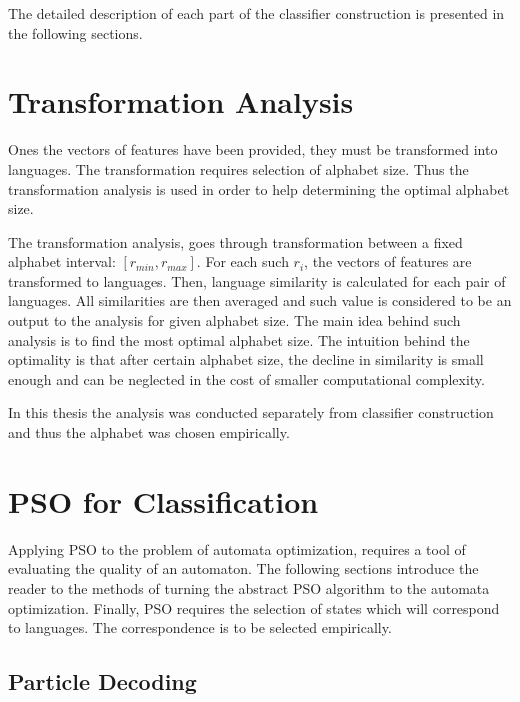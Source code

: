 \documentclass{mini}
\begin{document}
The detailed description of each part of the classifier construction is presented in the following sections.

\section{Transformation Analysis}
Ones the vectors of features have been provided, they must be transformed into languages. The transformation requires selection of alphabet size. Thus the transformation analysis is used in order to help determining the optimal alphabet size.

The transformation analysis, goes through transformation between a fixed alphabet interval: $[r_{min}, r_{max}]$. For each such $r_{i}$, the vectors of features are transformed to languages. Then, language similarity is calculated for each pair of languages. All similarities are then averaged and such value is considered to be an output to the analysis for given alphabet size. The main idea behind such analysis is to find the most optimal alphabet size. The intuition behind the optimality is that after certain alphabet size, the decline in similarity is small enough and can be neglected in the cost of smaller computational complexity.

In this thesis the analysis was conducted separately from classifier construction and thus the alphabet was chosen empirically.

\section{PSO for Classification}
 
Applying PSO to the problem of automata optimization, requires a tool of evaluating the quality of an automaton. The following sections introduce the reader to the methods of turning the abstract PSO algorithm to the automata optimization. Finally, PSO requires the selection of states which will correspond to languages. The correspondence is to be selected empirically. 

\subsection{Particle Decoding}
\end{document}
